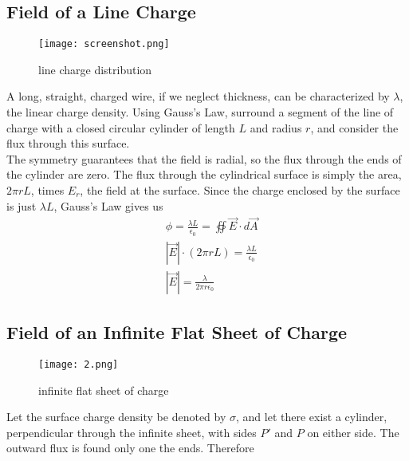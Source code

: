 \documentclass[svgnames]{article}
\begin{document}
\subsection{Field of a Line Charge} 

\vspace{20px} 
\begin{figure}[!htb]
  \centering
  \texttt{[image: screenshot.png]}
  \caption{line charge distribution}
\end{figure}

\vspace{10px}

A long, straight, charged wire, if we neglect thickness, can be characterized
by $\lambda$, the linear charge density. Using Gauss's Law, surround a segment
of the line of charge with a closed circular cylinder of length $L$ and radius
$r$, and consider the flux through this surface. \\

The symmetry guarantees that the field is radial, so the flux through the ends
of the cylinder are zero. The flux through the cylindrical surface is simply
the area, $2\pi rL$, times $E_r$, the field at the surface. Since the charge
enclosed by the surface is just $\lambda L$, Gauss's Law gives us \\

\begin{align*}
 & \phi = \frac{\lambda L}{\epsilon_0} = \oiint \vec{E} \cdot d\vec{A} \\
 & |\vec{E}| \cdot (2 \pi r L) = \frac{\lambda L}{\epsilon_0} \\
 & |\vec{E}| = \frac{\lambda}{2\pi r \epsilon_0}
\end{align*}  

\subsection{Field of an Infinite Flat Sheet of Charge}

\vspace{20px}
\begin{figure}[!hb]
  \centering
  \texttt{[image: 2.png]}
  \caption{infinite flat sheet of charge}
\end{figure}
\vspace{20px}

Let the surface charge density be denoted by $\sigma$, and let there exist
a cylinder, perpendicular through the infinite sheet, with sides $P'$ and $P$
on either side. The outward flux is found only one the ends. Therefore
\end{document}
